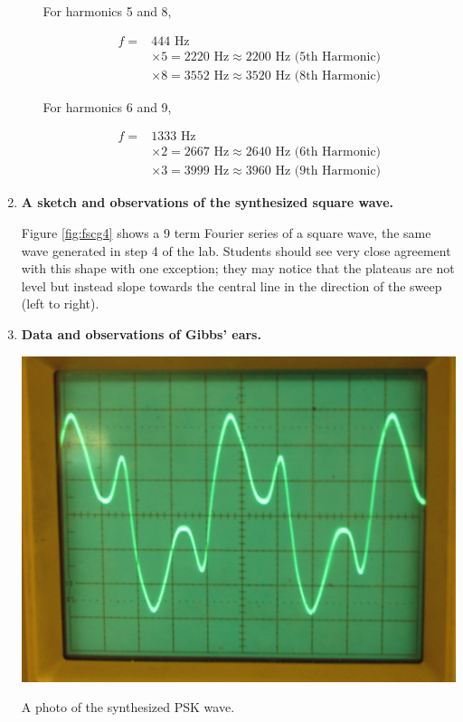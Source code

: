 \begin{enumerate}[resume]
\begin{enumerate}[label=(\Alph*)]
For harmonics 5 and 8,

\begin{align}
f=&444\text{ Hz}\\
&\times5=2220\text{ Hz}\approx 2200\text{ Hz (5th Harmonic)}\\
&\times8=3552\text{ Hz}\approx 3520\text{ Hz (8th Harmonic)}
\label{equ:fscg13}
\end{align}\newline

For harmonics 6 and 9,

\begin{align}
f=&1333\text{ Hz}\\
&\times2=2667\text{ Hz}\approx 2640\text{ Hz (6th Harmonic)}\\
&\times3=3999\text{ Hz}\approx 3960\text{ Hz (9th Harmonic)}
\label{equ:fscg14}
\end{align}

\end{enumerate}



\item {\bf A sketch and observations of the synthesized square wave.}\newline

Figure \ref{fig:fscg4} shows a 9 term Fourier series of a square wave, the same wave generated in step 4 of the lab. Students should see very close agreement with this shape with one exception; they may notice that the plateaus are not level but instead slope towards the central line in the direction of the sweep (left to right).

\pagebreak
\item {\bf Data and observations of Gibbs' ears.}

\begin{marginfigure}
\includegraphics[scale=.85]{FS-PSK-sketch.jpg}
\caption{A photo of the synthesized PSK wave.}
\label{fig:fscg13}
\end{marginfigure}


\end{enumerate}
